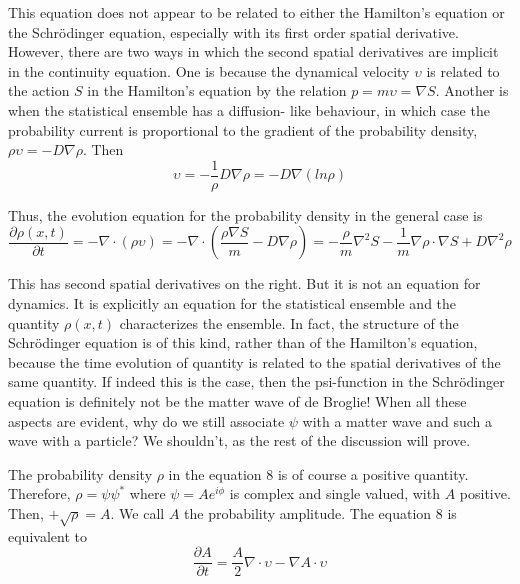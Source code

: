 This equation does not appear to be related to either the Hamilton's equation or the
Schr\"{o}dinger equation, especially with its first order spatial derivative. However, there are
two ways in which the second spatial derivatives are implicit in the continuity equation. One
is because the dynamical velocity $\upsilon$ is related to the action $S$ in the Hamilton's equation
by the relation $p = m \upsilon =\nabla S$. Another is when the statistical ensemble has a diffusion-
like behaviour, in which case the probability current is proportional to the gradient of the
probability density, $\rho \upsilon = - D \nabla \rho$. Then
\begin{equation*}
\upsilon = - \frac{1}{\rho} D \nabla \rho  = - D \nabla (l n \rho) \tag{9}
\end{equation*}


Thus, the evolution equation for the probability density in the general case is
\begin{equation*}
\frac{\partial \rho (x,t)}{\partial t} = - \nabla \cdot (\rho \upsilon) = - \nabla \cdot \left(\frac{\rho \nabla S}{m} - D \nabla \rho \right) = - \frac{\rho}{m} \nabla^2 S - \frac{1}{m} \nabla \rho \cdot \nabla S + D \nabla^2 \rho \tag{10} 
\end{equation*}

This has second spatial derivatives on the right. But it is not an equation for dynamics. It
is explicitly an equation for the statistical ensemble and the quantity $\rho (x, t)$ characterizes
the ensemble. In fact, the structure of the Schr\"{o}dinger equation is of this kind, rather than
of the Hamilton's equation, because the time evolution of quantity is related to the spatial
derivatives of the same quantity. If indeed this is the case, then the psi-function in the
Schr\"{o}dinger equation is definitely not be the matter wave of de Broglie! When all these
aspects are evident, why do we still associate $\psi$ with a matter wave and such a wave with a
particle? We shouldn't, as the rest of the discussion will prove.

The probability density $\rho$ in the equation 8 is of course a positive quantity. Therefore,
$\rho = \psi \psi^{\ast}$ where $\psi = Ae^{i\phi}$ is complex and single valued, with $A$ positive. Then, $+\sqrt{\rho} = A$.
We call $A$ the probability amplitude. The equation 8 is equivalent to
\begin{equation*}
\frac{\partial A}{\partial t} = \frac{A}{2} \nabla \cdot \upsilon - \nabla A \cdot \upsilon \tag{11}
\end{equation*}

